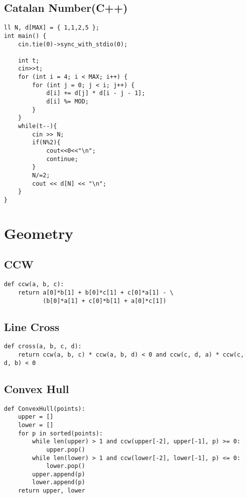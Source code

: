 \documentclass[landscape, 8pt, a4paper, oneside, twocolumn]{extarticle}
\begin{document}
\subsection{Catalan Number(C++)}
\begin{verbatim}
ll N, d[MAX] = { 1,1,2,5 };
int main() {
	cin.tie(0)->sync_with_stdio(0);

	int t;
	cin>>t;
	for (int i = 4; i < MAX; i++) {
		for (int j = 0; j < i; j++) {
			d[i] += d[j] * d[i - j - 1];
			d[i] %= MOD;
		}
	}
	while(t--){
		cin >> N;
		if(N%2){
			cout<<0<<"\n";
			continue;
		}
		N/=2;
		cout << d[N] << "\n";
	}
}
\end{verbatim}
\section{Geometry}
\subsection{CCW}
\begin{verbatim}
def ccw(a, b, c):
    return a[0]*b[1] + b[0]*c[1] + c[0]*a[1] - \
           (b[0]*a[1] + c[0]*b[1] + a[0]*c[1])
\end{verbatim}
\subsection{Line Cross}
\begin{verbatim}
def cross(a, b, c, d):
    return ccw(a, b, c) * ccw(a, b, d) < 0 and ccw(c, d, a) * ccw(c, d, b) < 0
\end{verbatim}
\subsection{Convex Hull}
\begin{verbatim}
def ConvexHull(points):
    upper = []
    lower = []
    for p in sorted(points):
        while len(upper) > 1 and ccw(upper[-2], upper[-1], p) >= 0:
            upper.pop()
        while len(lower) > 1 and ccw(lower[-2], lower[-1], p) <= 0:
            lower.pop()
        upper.append(p)
        lower.append(p)
    return upper, lower
\end{verbatim}
\end{document}
